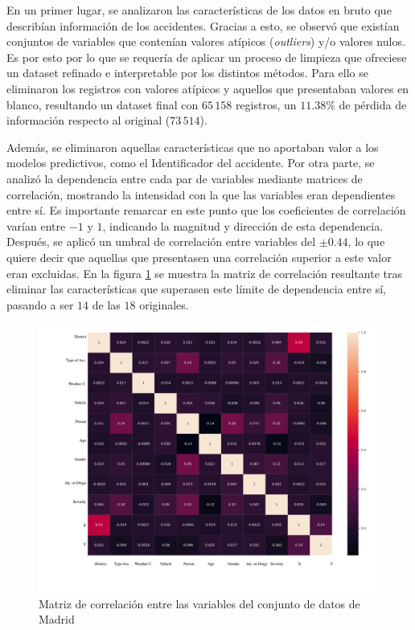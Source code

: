 
En un primer lugar, se analizaron las características de los datos en bruto que describían información de los accidentes. Gracias a esto, se observó que existían conjuntos de variables que contenían valores atípicos (\textit{outliers}) y/o valores nulos. Es por esto por lo que se requería de aplicar un proceso de limpieza que ofreciese un dataset refinado e interpretable por los distintos métodos. Para ello se eliminaron los registros con valores atípicos y aquellos que presentaban valores en blanco, resultando un dataset final con $65\,158$ registros, un $11.38\%$ de pérdida de información respecto al original ($73\,514$).


Además, se eliminaron aquellas características que no aportaban valor a los modelos predictivos, como el Identificador del accidente. Por otra parte, se analizó la dependencia entre cada par de variables mediante matrices de correlación, mostrando la intensidad con la que las variables eran dependientes entre sí. Es importante remarcar en este punto que los coeficientes de correlación varían entre $-1$ y $1$, indicando la magnitud y dirección de esta dependencia. Después, se aplicó un umbral de correlación entre variables del $\pm 0.44$, lo que quiere decir que aquellas que presentasen una correlación superior a este valor eran excluidas. En la figura \ref{CorrelationMatrix} se muestra la matriz de correlación resultante tras eliminar las características que superasen este límite de dependencia entre sí, pasando a ser $14$ de las $18$ originales.

\begin{figure}[H]
	\centering
	\includegraphics[width=12cm]{Figures/1stPaper/CorrelationMatrix.png}
	\caption{Matriz de correlación entre las variables del conjunto de datos de Madrid}
	\label{CorrelationMatrix}
\end{figure}


